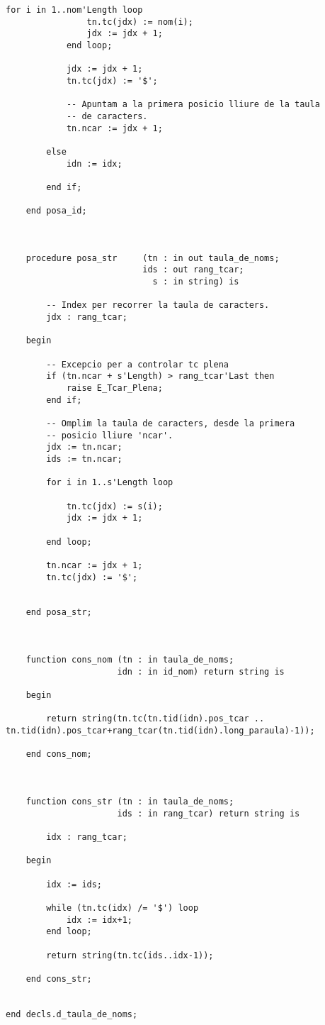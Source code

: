 \documentclass[10pt]{report}
\begin{document}
\begin{lstlisting}[style=Ada]
            for i in 1..nom'Length loop
                tn.tc(jdx) := nom(i);
                jdx := jdx + 1;
            end loop;
            
            jdx := jdx + 1;
            tn.tc(jdx) := '$';
            
            -- Apuntam a la primera posicio lliure de la taula 
            -- de caracters.
            tn.ncar := jdx + 1; 
            
        else
            idn := idx;
            
        end if;
        
    end posa_id;
    
    
    
    procedure posa_str     (tn : in out taula_de_noms; 
                           ids : out rang_tcar; 
                             s : in string) is
    
        -- Index per recorrer la taula de caracters.
        jdx : rang_tcar; 
        
    begin

        -- Excepcio per a controlar tc plena
        if (tn.ncar + s'Length) > rang_tcar'Last then
            raise E_Tcar_Plena;
        end if;
    
        -- Omplim la taula de caracters, desde la primera 
        -- posicio lliure 'ncar'.
        jdx := tn.ncar;
        ids := tn.ncar;
        
        for i in 1..s'Length loop
                
            tn.tc(jdx) := s(i);
            jdx := jdx + 1;
                
        end loop;
        
        tn.ncar := jdx + 1;
        tn.tc(jdx) := '$';

    
    end posa_str;
    
    
    
    function cons_nom (tn : in taula_de_noms; 
                      idn : in id_nom) return string is
        
    begin
    
        return string(tn.tc(tn.tid(idn).pos_tcar .. tn.tid(idn).pos_tcar+rang_tcar(tn.tid(idn).long_paraula)-1));
        
    end cons_nom;    
    
    
    
    function cons_str (tn : in taula_de_noms; 
                      ids : in rang_tcar) return string is
    
        idx : rang_tcar;
        
    begin
        
        idx := ids;
    
        while (tn.tc(idx) /= '$') loop
            idx := idx+1;
        end loop;
        
        return string(tn.tc(ids..idx-1));
        
    end cons_str;
                

end decls.d_taula_de_noms;
    \end{lstlisting}
    
\end{document}
